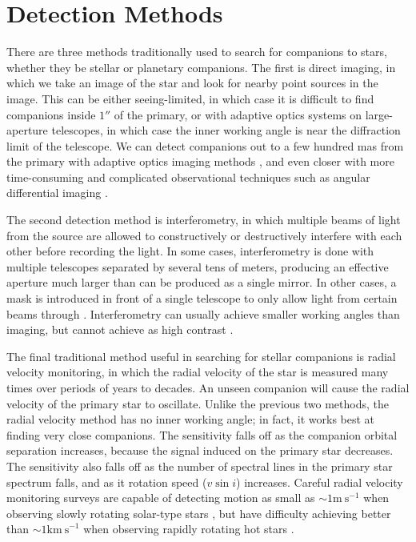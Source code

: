 \documentclass{utthesis}
\begin{document}
\section{Detection Methods}

There are three methods traditionally used to search for companions to stars, whether they be stellar or planetary companions. The first is direct imaging, in which we take an image of the star and look for nearby point sources in the image. This can be either seeing-limited, in which case it is difficult to find companions inside $1''$ of the primary, or with adaptive optics systems on large-aperture telescopes, in which case the inner working angle is near the diffraction limit of the telescope. We can detect companions out to a few hundred mas from the primary with adaptive optics imaging methods \citep[see][for typical sensitivity curves of a binary survey]{DeRosa2014}, and even closer with more time-consuming and complicated observational techniques such as angular differential imaging \citep{Marois2006}. 

The second detection method is interferometry, in which multiple beams of light from the source are allowed to constructively or destructively interfere with each other before recording the light. In some cases, interferometry is done with multiple telescopes separated by several tens of meters, producing an effective aperture much larger than can be produced as a single mirror. In other cases, a mask is introduced in front of a single telescope to only allow light from certain beams through \citep[aperture masking,][]{Tuthill2000, Ireland2008}. Interferometry can usually achieve smaller working angles than imaging, but cannot achieve as high contrast \citep[see e.g.][]{Aldoretta2015}.

The final traditional method useful in searching for stellar companions is radial velocity monitoring, in which the radial velocity of the star is measured many times over periods of years to decades. An unseen companion will cause the radial velocity of the primary star to oscillate. Unlike the previous two methods, the radial velocity method has no inner working angle; in fact, it works best at finding very close companions. The sensitivity falls off as the companion orbital separation increases, because the signal induced on the primary star decreases. The sensitivity also falls off as the number of spectral lines in the primary star spectrum falls, and as it rotation speed ($v\sin{i}$) increases. Careful radial velocity monitoring surveys are capable of detecting motion as small as $\sim 1 \mathrm{m\ s}^{-1}$ when observing slowly rotating solar-type stars \citep[e.g.][]{Wittenmyer2006, Fischer2009, Pepe2011}, but have difficulty achieving better than $\sim 1 \mathrm{km\ s}^{-1}$ when observing rapidly rotating hot stars \citep{Becker2015}.
\end{document}
